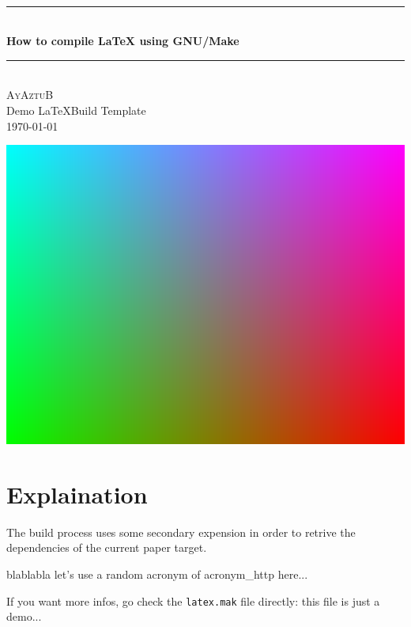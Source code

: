 \documentclass[12pt,a4paper]{article}
\theoremstyle{definition}
\begin{document}
\begin{titlepage}
	\newcommand{\HRule}{\rule{\linewidth}{0.5mm}}
	\center
	\textsc{\LARGE
	} \\[1cm]
	\HRule \\[0.4cm]
	{ \huge \bfseries How to compile LaTeX using GNU/Make\\[0.15cm] }
	\HRule \\[1.5cm]
	\textsc{AyAztuB}\\[0.5cm]
	Demo \LaTeX Build Template\\[0.5cm]
	\today
	\\[1.5cm]

\end{titlepage}

\tableofcontents
\newpage

\includegraphics[width=0.9\linewidth]{img.png}

\newpage

\section{Explaination}

The build process uses some secondary expension \cite{GNUMake} in order to retrive the dependencies of the current paper target.

blablabla let's use a random acronym of \acrshort{acronym_http} here...

If you want more infos, go check the \texttt{latex.mak} file directly: this file is just a demo...

\newpage
\end{document}
